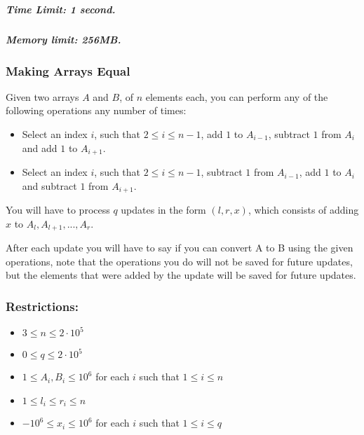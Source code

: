 \hypertarget{time-limit-1-second.}{%
\subparagraph{Time Limit: 1 second.}\label{time-limit-1-second.}}

\hypertarget{memory-limit-256mb.}{%
\subparagraph{Memory limit: 256MB.}\label{memory-limit-256mb.}}

\hypertarget{making-arrays-equal}{%
\subsubsection{Making Arrays Equal}\label{making-arrays-equal}}

Given two arrays \(A\) and \(B\), of \(n\) elements each, you can
perform any of the following operations any number of times:

\begin{itemize}
\item
  Select an index \(i\), such that \(2 \leq i \leq n-1\), add \(1\) to
  \(A_{i-1}\), subtract \(1\) from \(A_{i}\) and add \(1\) to
  \(A_{i + 1}\).
\item
  Select an index \(i\), such that \(2 \leq i \leq n-1\), subtract \(1\)
  from \(A_{i-1}\), add \(1\) to \(A_{i}\) and subtract \(1\) from
  \(A_ {i + 1}\).
\end{itemize}

You will have to process \(q\) updates in the form \((l, r, x)\), which
consists of adding \(x\) to \(A_{l}, A_{l + 1}, ..., A_{r}\).

After each update you will have to say if you can convert A to B using
the given operations, note that the operations you do will not be saved
for future updates, but the elements that were added by the update will
be saved for future updates.

\hypertarget{restrictions}{%
\subsubsection{Restrictions:}\label{restrictions}}

\begin{itemize}
\item
  \(3 \leq n \leq 2 \cdot 10 ^ 5\)
\item
  \(0 \leq q \leq 2 \cdot 10 ^ 5\)
\item
  \(1 \leq A_i, B_i \leq 10 ^ 6\) for each \(i\) such that
  \(1 \leq i \leq n\)
\item
  \(1 \leq l_i \leq r_i \leq n\)
\item
  \(-10 ^ 6 \leq x_i \leq 10 ^ 6\) for each \(i\) such that
  \(1 \leq i \leq q\)
\end{itemize}


